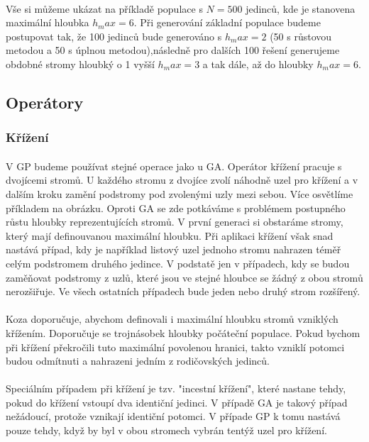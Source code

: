 \documentclass[bc,male,java,dept460]{diploma}		%
\begin{document}
\paragraph*{}
Vše si můžeme ukázat na příkladě populace s $N=500$ jedinců, kde je stanovena maximální hloubka $h_max=6$. Při generování základní populace budeme postupovat tak, že 100 jedinců bude generováno s $h_max=2$ (50 s růstovou metodou a 50 s úplnou metodou),následně pro dalších 100 řešení generujeme obdobné stromy hloubký o 1 vyšší $h_max=3$ a tak dále, až do hloubky $h_max=6$.

\subsection{Operátory}

\subsubsection{Křížení}
\paragraph*{}
V GP budeme používat stejné operace jako u GA. Operátor křížení pracuje s dvojícemi stromů. U každého stromu z dvojíce zvolí náhodně uzel pro křížení a v dalším kroku zamění podstromy pod zvolenými uzly mezi sebou. Více osvětlíme příkladem na obrázku. Oproti GA se zde potkáváme s problémem postupného růstu hloubky reprezentujících stromů. V první generaci si obstaráme stromy, který mají definouvanou maximální hloubku. Při aplikaci křížení však snad nastává případ, kdy je například listový uzel jednoho stromu nahrazen téměř celým podstromem druhého jedince. V podstatě jen v případech, kdy se budou zaměňovat podstromy z uzlů, které jsou ve stejné hloubce se žádný z obou stromů nerozšiřuje. Ve všech ostatních případech bude jeden nebo druhý strom rozšířený.

\paragraph*{}
Koza doporučuje, abychom definovali i maximální hloubku stromů vzniklých křížením. Doporučuje se trojnásobek hloubky počáteční populace. Pokud bychom při křížení překročili tuto maximální povolenou hranici, takto vzniklí potomci budou odmítnuti a nahrazeni jedním z rodičovských jedinců.

\paragraph*{}
Speciálním případem při křížení je tzv. "incestní křížení", které nastane tehdy, pokud do křížení vstoupí dva identiční jedinci. V případě GA je takový případ nežádoucí, protože vznikají identiční potomci. V případe GP k tomu nastává pouze tehdy, když by byl v obou stromech vybrán tentýž uzel pro křížení.
\end{document}
